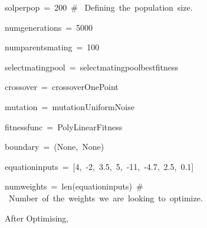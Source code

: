 \documentclass[12pt]{article}
\renewcommand{\_}{\kern-1.5pt\textunderscore\kern-1.5pt}
\begin{document}
{\fontsize{10pt}{12.0pt}\selectfont \textcolor[HTML]{D4D4D4}{sol\_per\_pop = 200 $\#$  Defining the population size.}\par}\par

{\fontsize{10pt}{12.0pt}\selectfont \textcolor[HTML]{D4D4D4}{num\_generations = 5000}\par}\par

{\fontsize{10pt}{12.0pt}\selectfont \textcolor[HTML]{D4D4D4}{num\_parents\_mating = 100}\par}\par


\vspace{\baselineskip}
{\fontsize{10pt}{12.0pt}\selectfont \textcolor[HTML]{D4D4D4}{select\_mating\_pool = select\_mating\_pool\_bestfitness}\par}\par

{\fontsize{10pt}{12.0pt}\selectfont \textcolor[HTML]{D4D4D4}{crossover = crossover\_OnePoint}\par}\par

{\fontsize{10pt}{12.0pt}\selectfont \textcolor[HTML]{D4D4D4}{mutation = mutation\_UniformNoise}\par}\par

{\fontsize{10pt}{12.0pt}\selectfont \textcolor[HTML]{D4D4D4}{fitness\_func = PolyLinearFitness}\par}\par

{\fontsize{10pt}{12.0pt}\selectfont \textcolor[HTML]{D4D4D4}{boundary = (None, None)}\par}\par

{\fontsize{10pt}{12.0pt}\selectfont \textcolor[HTML]{D4D4D4}{equation\_inputs = [4, -2, 3.5, 5, -11, -4.7, 2.5, 0.1]}\par}\par

{\fontsize{10pt}{12.0pt}\selectfont \textcolor[HTML]{D4D4D4}{num\_weights = len(equation\_inputs) $\#$  Number of the weights we are looking to optimize.}\par}\par


\vspace{\baselineskip}

\vspace{\baselineskip}
{\fontsize{14pt}{16.8pt}\selectfont After Optimising,\par}\par
\end{document}
